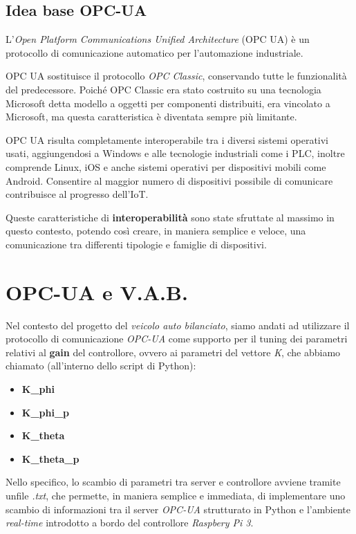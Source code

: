 \subsection{Idea base OPC-UA}
L'\textit{Open Platform Communications Unified Architecture} (OPC UA) è un protocollo di comunicazione automatico per l'automazione industriale. 

OPC UA sostituisce il protocollo \textit{OPC Classic}, conservando tutte le funzionalità del predecessore. Poiché OPC Classic era stato costruito su una tecnologia Microsoft detta modello a oggetti per componenti distribuiti, era vincolato a Microsoft, ma questa caratteristica è diventata sempre più limitante.

OPC UA risulta completamente interoperabile tra i diversi sistemi operativi usati, aggiungendosi a Windows e alle tecnologie industriali come i PLC, inoltre comprende Linux, iOS e anche sistemi operativi per dispositivi mobili come Android. Consentire al maggior numero di dispositivi possibile di comunicare contribuisce al progresso dell'IoT.

Queste caratteristiche di \textbf{interoperabilità} sono state sfruttate al massimo in questo contesto, potendo così creare, in maniera semplice e veloce, una comunicazione tra differenti tipologie e famiglie di dispositivi.

\section{OPC-UA e V.A.B.}
Nel contesto del progetto del \textit{veicolo auto bilanciato}, siamo andati ad utilizzare il protocollo di comunicazione \textit{OPC-UA} come supporto per il tuning dei parametri relativi al \textbf{gain} del controllore, ovvero ai parametri del vettore \textit{K}, che abbiamo chiamato (all'interno dello script di Python):
\begin{itemize}
	\item \textbf{K\_phi}
	\item \textbf{K\_phi\_p}
	\item \textbf{K\_theta}
	\item \textbf{K\_theta\_p}
\end{itemize}

Nello specifico, lo scambio di parametri tra server e controllore avviene tramite unfile \textit{.txt}, che permette, in maniera semplice e immediata, di implementare uno scambio di informazioni tra il server \textit{OPC-UA} strutturato in Python e l'ambiente \textit{real-time} introdotto a bordo del controllore \textit{Raspbery Pi 3}.


